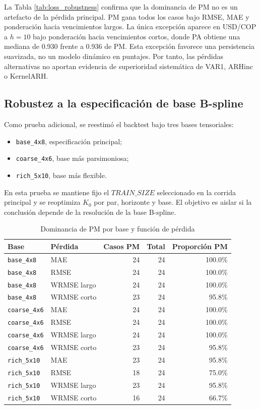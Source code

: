 \documentclass[a4paper,11pt]{article}
\begin{document}
La Tabla \ref{tab:loss_robustness} confirma que la dominancia de PM no es un artefacto de la pérdida principal. PM gana todos los casos bajo RMSE, MAE y ponderación hacia vencimientos largos. La única excepción aparece en USD/COP a \(h=10\) bajo ponderación hacia vencimientos cortos, donde PA obtiene una mediana de 0.930 frente a 0.936 de PM. Esta excepción favorece una persistencia suavizada, no un modelo dinámico en puntajes. Por tanto, las pérdidas alternativas no aportan evidencia de superioridad sistemática de VAR1, ARHinc o KernelARH.

\subsection{Robustez a la especificación de base B-spline}

Como prueba adicional, se reestimó el backtest bajo tres bases tensoriales:
\begin{itemize}
  \item \texttt{base\_4x8}, especificación principal;
  \item \texttt{coarse\_4x6}, base más parsimoniosa;
  \item \texttt{rich\_5x10}, base más flexible.
\end{itemize}
En esta prueba se mantiene fijo el \(TRAIN\_SIZE\) seleccionado en la corrida principal y se reoptimiza \(K_0\) por par, horizonte y base. El objetivo es aislar si la conclusión depende de la resolución de la base B-spline.

\begin{table}[H]
\centering
\caption{Dominancia de PM por base y función de pérdida}
\label{tab:basis_robustness}
\scriptsize
\begin{tabular}{llrrr}
\toprule
Base & Pérdida & Casos PM & Total & Proporción PM \\
\midrule
\texttt{base\_4x8} & MAE & 24 & 24 & 100.0\% \\
\texttt{base\_4x8} & RMSE & 24 & 24 & 100.0\% \\
\texttt{base\_4x8} & WRMSE largo & 24 & 24 & 100.0\% \\
\texttt{base\_4x8} & WRMSE corto & 23 & 24 & 95.8\% \\
\texttt{coarse\_4x6} & MAE & 24 & 24 & 100.0\% \\
\texttt{coarse\_4x6} & RMSE & 24 & 24 & 100.0\% \\
\texttt{coarse\_4x6} & WRMSE largo & 24 & 24 & 100.0\% \\
\texttt{coarse\_4x6} & WRMSE corto & 23 & 24 & 95.8\% \\
\texttt{rich\_5x10} & MAE & 23 & 24 & 95.8\% \\
\texttt{rich\_5x10} & RMSE & 18 & 24 & 75.0\% \\
\texttt{rich\_5x10} & WRMSE largo & 23 & 24 & 95.8\% \\
\texttt{rich\_5x10} & WRMSE corto & 16 & 24 & 66.7\% \\
\bottomrule
\end{tabular}
\end{table}
\end{document}

